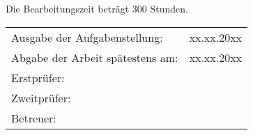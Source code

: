 \begin{spacing}{1}
Die Bearbeitungszeit beträgt 300 Stunden.

\vfill
\begin{center}
\begin{tabular}{p{} p{}}
Ausgabe der Aufgabenstellung:&xx.xx.20xx\\
Abgabe der Arbeit spätestens am:&xx.xx.20xx\\
Erstprüfer: \\
Zweitprüfer: \\
Betreuer: 
\end{tabular}
\end{center}

\end{spacing}
\cleardoublepage